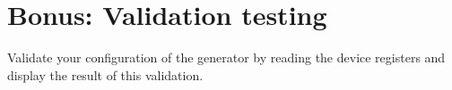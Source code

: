 \documentclass{labo}
\begin{document}
\section{Bonus: Validation testing}
Validate your configuration of the generator by reading the device registers and display the result of this validation.









\end{document}
